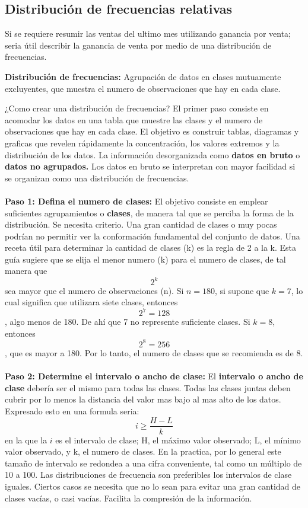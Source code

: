 \documentclass[]{article}
\begin{document}
\subsection{Distribución de frecuencias relativas}
Si se requiere resumir las ventas del ultimo mes utilizando ganancia por venta; seria útil describir la ganancia de venta por medio de una distribución de frecuencias.
\begin{center}
	\textbf{Distribución de frecuencias: }Agrupación de datos en clases mutuamente excluyentes, que muestra el numero de observaciones que hay en cada clase.
\end{center}
¿Como crear una distribución de frecuencias? El primer paso consiste en acomodar los datos en una tabla que muestre las clases y el numero de observaciones que hay en cada clase. El objetivo es construir tablas, diagramas y graficas que revelen rápidamente la concentración, los valores extremos y la distribución de los datos. La información desorganizada como \textbf{datos en bruto} o \textbf{datos no agrupados.} Los datos en bruto se interpretan con mayor facilidad si se organizan como una distribución de frecuencias.\\\\
\textbf{Paso 1: Defina el numero de clases: }El objetivo consiste en emplear suficientes agrupamientos o \textbf{clases}, de manera tal que se perciba la forma de la distribución. Se necesita criterio. Una gran cantidad de clases o muy pocas podrían no permitir ver la conformación fundamental del conjunto de datos. Una receta útil para determinar la cantidad de clases (k) es la regla de 2 a la k. Esta guía sugiere que se elija el menor numero (k) para el numero de clases, de tal manera que \[2^{k}\] sea mayor que el numero de observaciones (n). Si $ n=180 $, si supone que $ k=7 $, lo cual significa que utilizara siete clases, entonces \[ 2^{7}=128 \], algo menos de 180. De ahí que 7 no represente suficiente clases. Si $ k=8 $, entonces \[ 2^{8}=256 \], que es mayor a 180. Por lo tanto, el numero de clases que se recomienda es de 8.\\\\
\textbf{Paso 2: Determine el intervalo o ancho de clase:} El \textbf{intervalo o ancho de clase} debería ser el mismo para todas las clases. Todas las clases juntas deben cubrir por lo menos la distancia del valor mas bajo al mas alto de los datos. Expresado esto en una formula seria: \[ i\geq\frac{H-L}{k} \] en la que la $ i $ es el intervalo de clase; H, el máximo valor observado; L, el mínimo valor observado, y k, el numero de clases. En la practica, por lo general este tamaño de intervalo se redondea a una cifra conveniente, tal como un múltiplo de 10 a 100. Las distribuciones de frecuencia son preferibles los intervalos de clase iguales. Ciertos casos se necesita que no lo sean para evitar una gran cantidad de clases vacías, o casi vacías. Facilita la compresión de la información.\\\\
\end{document}
